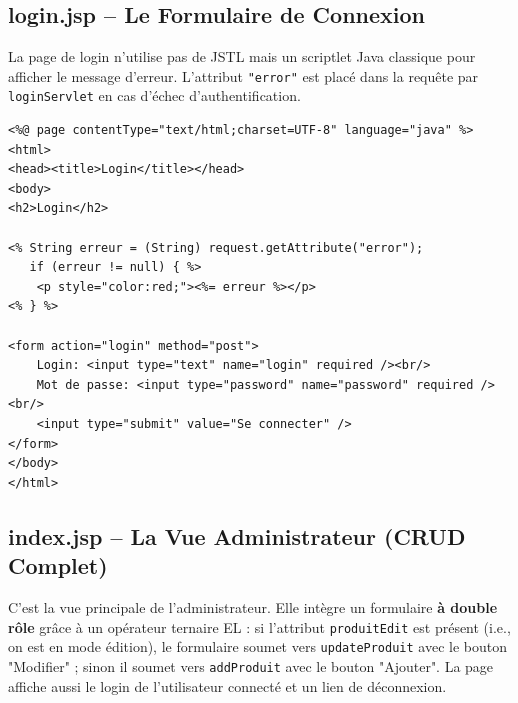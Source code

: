 \documentclass[12pt, a4paper]{article}
\begin{document}
\subsection{login.jsp -- Le Formulaire de Connexion}

La page de login n'utilise pas de JSTL mais un scriptlet Java classique pour afficher le message d'erreur. L'attribut \texttt{"error"} est placé dans la requête par \texttt{loginServlet} en cas d'échec d'authentification.

\begin{lstlisting}[style=jspstyle, caption=webapp/login.jsp]
<%@ page contentType="text/html;charset=UTF-8" language="java" %>
<html>
<head><title>Login</title></head>
<body>
<h2>Login</h2>

<% String erreur = (String) request.getAttribute("error");
   if (erreur != null) { %>
    <p style="color:red;"><%= erreur %></p>
<% } %>

<form action="login" method="post">
    Login: <input type="text" name="login" required /><br/>
    Mot de passe: <input type="password" name="password" required /><br/>
    <input type="submit" value="Se connecter" />
</form>
</body>
</html>
\end{lstlisting}

\subsection{index.jsp -- La Vue Administrateur (CRUD Complet)}

C'est la vue principale de l'administrateur. Elle intègre un formulaire \textbf{à double rôle} grâce à un opérateur ternaire EL : si l'attribut \texttt{produitEdit} est présent (i.e., on est en mode édition), le formulaire soumet vers \texttt{updateProduit} avec le bouton "Modifier" ; sinon il soumet vers \texttt{addProduit} avec le bouton "Ajouter". La page affiche aussi le login de l'utilisateur connecté et un lien de déconnexion.
\end{document}
